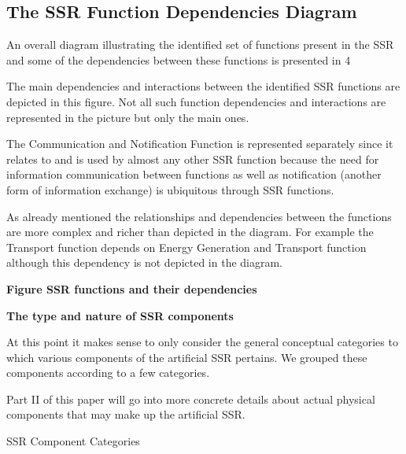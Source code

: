 \bigskip

\subsection[The SSR Function Dependencies Diagram]{The SSR Function
Dependencies Diagram}
\hypertarget{RefHeading3106306210128}{}An overall diagram illustrating
the identified set of functions present in the SSR and some of the
dependencies between these functions is presented in 4


\bigskip

The main dependencies and interactions between the identified SSR
functions are depicted in this figure. Not all such function
dependencies and interactions are represented in the picture but only
the main ones. 


\bigskip

The Communication and Notification Function is represented separately
since it relates to and is used by almost any other SSR function
because the need for information communication between functions as
well as notification (another form of information exchange) is
ubiquitous through SSR functions.


\bigskip

As already mentioned the relationships and dependencies between the
functions are more complex and richer than depicted in the diagram. For
example the Transport function depends on Energy Generation and
Transport function although this dependency is not depicted in the
diagram.


\bigskip


\bigskip

{\bfseries
\label{bkm:Ref330735805}Figure  SSR functions and their dependencies}


\bigskip


\bigskip

{\bfseries
\hypertarget{RefHeading3108306210128}{}The type and nature of SSR
components}


\bigskip

At this point it makes sense to only consider the general conceptual
categories to which various components of the artificial SSR pertains.
We grouped these components according to a few categories.

Part II of this paper will go into more concrete details about actual
physical components that may make up the artificial SSR.


\bigskip

SSR Component Categories


